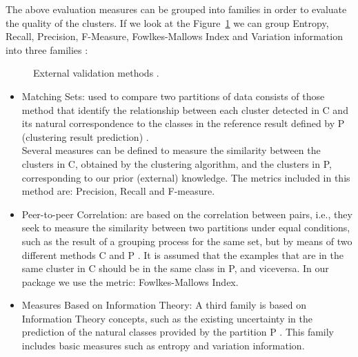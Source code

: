 The above evaluation measures can be grouped into families in order to evaluate the quality of the clusters. If we look at the Figure~\ref{fig:external} we can group Entropy, Recall, Precision, F-Measure, Fowlkes-Mallows Index and Variation information into three families \citep{b54}:

\begin{figure}[htbp]
  \centering
    \caption{External validation methods \citep{b54}.}%
    \label{fig:external}%
\end{figure}

\begin{itemize}
  \item Matching Sets: used to compare two partitions of data consists of those method that identify the relationship between each cluster detected in C and its natural correspondence to the classes in the reference result defined by P (clustering result prediction) \citep{b54}.\\
Several measures can be defined to measure the similarity between the clusters in C, obtained by the clustering algorithm, and the clusters in P, corresponding to our prior (external) knowledge. The metrics included in this method are: Precision, Recall and F-measure.
  \item Peer-to-peer Correlation: are based on the correlation between pairs, i.e., they seek to measure the similarity between two partitions under equal conditions, such as the result of a grouping process for the same set, but by means of two different methods C and P \citep{b54}. It is assumed that the examples that are in the same cluster in C should be in the same class in P, and viceversa. In our package we use the metric: Fowlkes-Mallows Index.
  \item Measures Based on Information Theory: A third family is based on Information Theory concepts, such as the existing uncertainty in the prediction of the natural classes provided by the partition P \citep{b54}. This family includes basic measures such as entropy and variation information.
\end{itemize}

